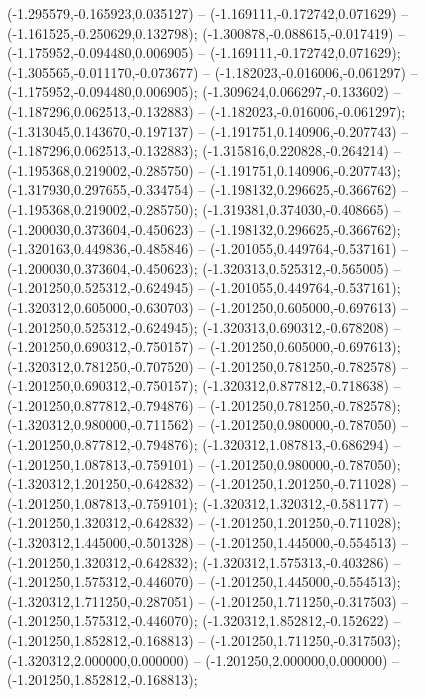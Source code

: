  (-1.295579,-0.165923,0.035127) -- (-1.169111,-0.172742,0.071629) -- (-1.161525,-0.250629,0.132798);
 (-1.300878,-0.088615,-0.017419) -- (-1.175952,-0.094480,0.006905) -- (-1.169111,-0.172742,0.071629);
 (-1.305565,-0.011170,-0.073677) -- (-1.182023,-0.016006,-0.061297) -- (-1.175952,-0.094480,0.006905);
 (-1.309624,0.066297,-0.133602) -- (-1.187296,0.062513,-0.132883) -- (-1.182023,-0.016006,-0.061297);
 (-1.313045,0.143670,-0.197137) -- (-1.191751,0.140906,-0.207743) -- (-1.187296,0.062513,-0.132883);
 (-1.315816,0.220828,-0.264214) -- (-1.195368,0.219002,-0.285750) -- (-1.191751,0.140906,-0.207743);
 (-1.317930,0.297655,-0.334754) -- (-1.198132,0.296625,-0.366762) -- (-1.195368,0.219002,-0.285750);
 (-1.319381,0.374030,-0.408665) -- (-1.200030,0.373604,-0.450623) -- (-1.198132,0.296625,-0.366762);
 (-1.320163,0.449836,-0.485846) -- (-1.201055,0.449764,-0.537161) -- (-1.200030,0.373604,-0.450623);
 (-1.320313,0.525312,-0.565005) -- (-1.201250,0.525312,-0.624945) -- (-1.201055,0.449764,-0.537161);
 (-1.320312,0.605000,-0.630703) -- (-1.201250,0.605000,-0.697613) -- (-1.201250,0.525312,-0.624945);
 (-1.320313,0.690312,-0.678208) -- (-1.201250,0.690312,-0.750157) -- (-1.201250,0.605000,-0.697613);
 (-1.320312,0.781250,-0.707520) -- (-1.201250,0.781250,-0.782578) -- (-1.201250,0.690312,-0.750157);
 (-1.320312,0.877812,-0.718638) -- (-1.201250,0.877812,-0.794876) -- (-1.201250,0.781250,-0.782578);
 (-1.320312,0.980000,-0.711562) -- (-1.201250,0.980000,-0.787050) -- (-1.201250,0.877812,-0.794876);
 (-1.320312,1.087813,-0.686294) -- (-1.201250,1.087813,-0.759101) -- (-1.201250,0.980000,-0.787050);
 (-1.320312,1.201250,-0.642832) -- (-1.201250,1.201250,-0.711028) -- (-1.201250,1.087813,-0.759101);
 (-1.320312,1.320312,-0.581177) -- (-1.201250,1.320312,-0.642832) -- (-1.201250,1.201250,-0.711028);
 (-1.320312,1.445000,-0.501328) -- (-1.201250,1.445000,-0.554513) -- (-1.201250,1.320312,-0.642832);
 (-1.320312,1.575313,-0.403286) -- (-1.201250,1.575312,-0.446070) -- (-1.201250,1.445000,-0.554513);
 (-1.320312,1.711250,-0.287051) -- (-1.201250,1.711250,-0.317503) -- (-1.201250,1.575312,-0.446070);
 (-1.320312,1.852812,-0.152622) -- (-1.201250,1.852812,-0.168813) -- (-1.201250,1.711250,-0.317503);
 (-1.320312,2.000000,0.000000) -- (-1.201250,2.000000,0.000000) -- (-1.201250,1.852812,-0.168813);
